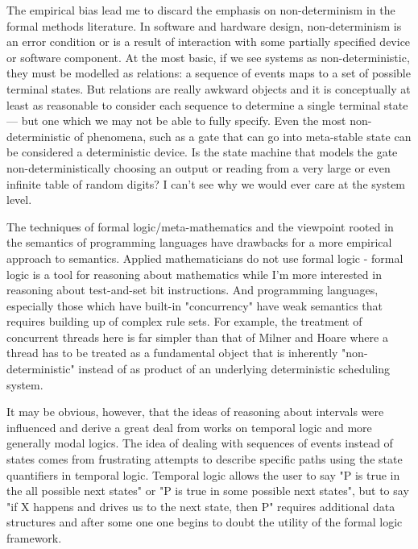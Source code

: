 \documentclass[english,11pt]{article}
\begin{document}
The empirical bias lead me to discard the emphasis on non-determinism in 
the formal methods literature. In software and hardware design, non-determinism
is an error condition or is a result of interaction with some partially
specified device or software component. At the most basic, if we see
systems as non-deterministic, they must be modelled as relations: a sequence
of events  maps to a set of possible terminal states. But relations are
really awkward objects and it is conceptually at least as reasonable to 
consider each sequence to determine a single terminal state --- but one which 
we may not be able to fully specify. Even the most non-deterministic of 
phenomena, such as a gate that can go into meta-stable state can be considered
a deterministic device. Is the state machine that models the gate 
non-deterministically choosing an output or reading from a very large or even infinite table of random digits? I can't see why we would ever care at the 
system level.

The techniques of formal logic/meta-mathematics and the viewpoint rooted in
the semantics of programming languages have drawbacks for a more empirical
approach to semantics.  Applied mathematicians do not use formal logic
- formal logic is a tool for reasoning about mathematics while I'm more
interested
in reasoning about test-and-set bit instructions.  And programming
languages, especially those which have built-in "concurrency" have weak
semantics that requires building up of complex rule sets.
For example, the treatment of concurrent threads here is far
simpler than that of Milner\cite{Milner} and Hoare \cite{Hoare} where a thread
has to be treated as a fundamental object that is inherently "non-deterministic"
instead of as product of an underlying deterministic scheduling system. 


It may be obvious, however, that the ideas of reasoning about intervals
were influenced and derive a great deal from works on temporal
logic\cite{Manna,Moszkowski} and more generally modal logics\cite{Kripke}. The idea of dealing with sequences of events
instead of states comes from frustrating attempts to describe specific 
paths using the state quantifiers in temporal logic. Temporal logic
allows the user to say "P is true in the all possible next states" or 
"P is true in some possible next states", but to say "if X happens and drives
us to the next state, then P" requires additional data structures and after
some one one begins to doubt the utility of the formal logic framework.




\end{document}
